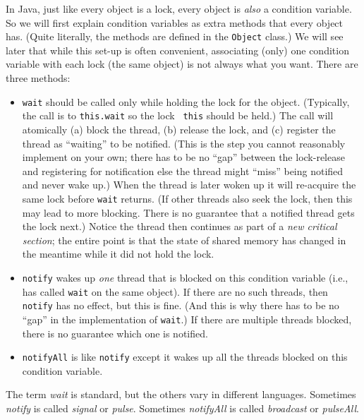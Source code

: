 \documentclass[10pt]{article}
\begin{document}
In Java, just like every object is a lock, every object is \emph{also}
a condition variable.  So we will first explain condition variables as
extra methods that every object has. (Quite literally, the methods are
defined in the {\tt Object} class.)  We will see later that while this
set-up is often convenient, associating (only) one condition variable
with each lock (the same object) is not always what you want.  There
are three methods:
\begin{itemize}
\item {\tt wait} should be called only while holding the lock for the
  object.  (Typically, the call is to {\tt this.wait} so the lock {\tt
    this} should be held.)  The call will atomically (a) block the thread,
  (b) release the lock, and (c) register the thread as
  ``waiting'' to be notified.  (This is the step you cannot reasonably
  implement on your own; there has to be no ``gap'' between the
  lock-release and registering for notification else the thread might ``miss''
  being notified and never wake up.)  When the thread is later woken
  up it will re-acquire the same lock before {\tt wait} returns.  (If
  other threads also seek the lock, then this may lead to more
  blocking.  There is no guarantee that a notified thread gets the
  lock next.)  Notice the thread then continues as part of a \emph{new
    critical section}; the entire point is that the state of shared
  memory has changed in the meantime while it did not hold the lock.
\item {\tt notify} wakes up \emph{one} thread that is blocked on this
  condition variable (i.e., has called {\tt wait} on the same object).
  If there are no such threads, then {\tt notify} has no effect, but
  this is fine.  (And this is why there has to be no ``gap'' in the
  implementation of {\tt wait}.)  If there are multiple threads
  blocked, there is no guarantee which one is notified.
\item {\tt notifyAll} is like {\tt notify} except it wakes up all the
  threads blocked on this condition variable.
\end{itemize}
The term \emph{wait} is standard, but the others vary in different
languages.  Sometimes \emph{notify} is called \emph{signal} or
\emph{pulse}.  Sometimes \emph{notifyAll} is called \emph{broadcast}
or \emph{pulseAll}.
\end{document}
